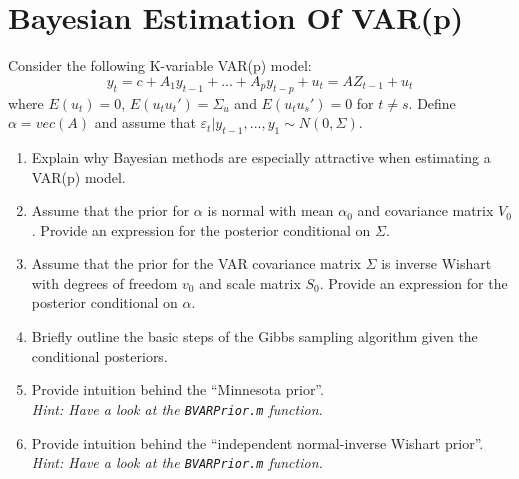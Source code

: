 \documentclass[a4paper]{scrartcl}
\begin{document}
\newpage
\section{Bayesian Estimation Of VAR(p)}
Consider the following K-variable VAR(p) model:
$$y_t = c + A_1 y_{t-1} + ... + A_p y_{t-p} + u_t= AZ_{t-1} + u_t$$ where $E(u_t)=0$, $E(u_t u_t')=\Sigma_{u}$ and $E(u_t u_s')=0$ for $t\neq s$. Define $\alpha = vec(A)$ and assume that $\varepsilon_t|y_{t-1},...,y_1\sim N(0,\Sigma)$.
\begin{enumerate}
	\item Explain why Bayesian methods are especially attractive when estimating a VAR(p) model.
	\item Assume that the prior for $\alpha$ is normal with mean $\alpha_0$ and covariance matrix $V_0$. Provide an expression for the posterior conditional on $\Sigma$.
	\item Assume that the prior for the VAR covariance matrix $\Sigma$ is inverse Wishart with degrees of freedom $v_0$ and scale matrix $S_0$. Provide an expression for the posterior conditional on $\alpha$. 
	\item Briefly outline the basic steps of the Gibbs sampling algorithm given the conditional posteriors.
	\item Provide intuition behind the \enquote{Minnesota prior}.\\\emph{Hint: Have a look at the \texttt{BVARPrior.m} function.}
	\item Provide intuition behind the \enquote{independent normal-inverse Wishart prior}.\\\emph{Hint: Have a look at the \texttt{BVARPrior.m} function.}
\end{enumerate}

\newpage
\end{document}
